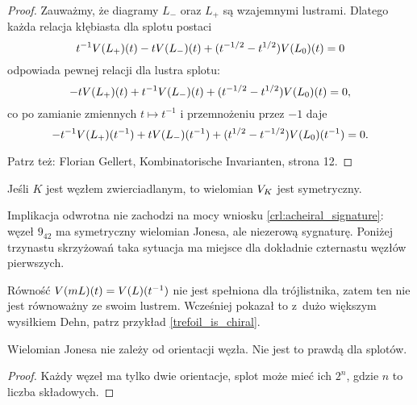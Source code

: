 \begin{proof}
    Zauważmy, że diagramy $L_-$ oraz $L_+$ są wzajemnymi lustrami.
    Dlatego każda relacja kłębiasta dla splotu postaci
    \begin{equation}
        t^{-1} V(L_+)(t) - tV(L_-)(t) + (t^{-1/2} - t^{1/2}) V(L_0)(t) = 0
    \end{equation}
    odpowiada pewnej relacji dla lustra splotu:
    \begin{equation}
        -tV(L_+)(t) + t^{-1} V(L_-)(t) + (t^{-1/2} - t^{1/2}) V(L_0)(t) = 0,
    \end{equation}
    co po zamianie zmiennych $t \mapsto t^{-1}$ i przemnożeniu przez $-1$ daje
    \begin{equation}
        -t^{-1} V(L_+)(t^{-1}) + t V(L_-)(t^{-1}) + (t^{1/2} - t^{-1/2}) V(L_0)(t^{-1}) = 0.
    \end{equation}

    Patrz też: Florian Gellert, Kombinatorische Invarianten, strona 12.
\end{proof}

\begin{corollary}
    \label{amphicheiral_implies_jones}
    Jeśli $K$ jest węzłem zwierciadlanym, to wielomian $V_K$ jest symetryczny.
\end{corollary}

Implikacja odwrotna nie zachodzi na mocy wniosku \ref{crl:acheiral_signature}: węzeł $9_{42}$ ma symetryczny wielomian Jonesa, ale niezerową sygnaturę.
Poniżej trzynastu skrzyżowań taka sytuacja ma miejsce dla dokładnie czternastu węzłów pierwszych.

Równość $V(mL)(t)=V(L)(t^{-1})$ nie jest spełniona dla trójlistnika, zatem ten nie jest równoważny ze swoim lustrem.
Wcześniej pokazał to z~dużo większym wysiłkiem Dehn, patrz przykład \ref{trefoil_is_chiral}.

\begin{corollary}
    Wielomian Jonesa nie zależy od orientacji węzła.
    Nie jest to prawdą dla splotów.
\end{corollary}

\begin{proof}
    Każdy węzeł ma tylko dwie orientacje, splot może mieć ich $2^n$, gdzie $n$ to liczba składowych.
\end{proof}

